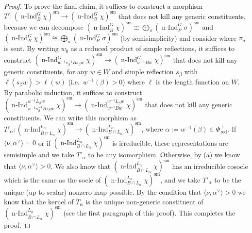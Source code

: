\documentclass[a4paper]{amsart}
\numberwithin{equation}{section}
\theoremstyle{remark}
\theoremstyle{definition}
\DeclareMathOperator{\nInd}{n-Ind}
\newcommand{\sm}{\mathrm{sm}}
\newcommand{\red}{\mathrm{red}}
\newcommand{\ang}[1]{\langle #1\rangle}
\renewcommand{\o}[1]{\overline{#1}}
\begin{document}
\begin{proof}
  To prove the final claim, it suffices to construct a morphism $T' \colon (\nInd_{\o B}^{G} \chi)^{\sm} \to (\nInd_{B}^{G} \chi)^{\sm}$ that does not kill any generic constituents, because we can decompose $(\nInd_{\o B}^{G} \chi)^{\sm} \cong \bigoplus_\sigma (\nInd_{\o P}^{G} \sigma)^{\sm}$ and $(\nInd_{B}^{G} \chi)^{\sm} \cong \bigoplus_\sigma (\nInd_{P}^{G} \sigma)^{\sm}$ (by semisimplicity) and consider where $\pi_\sigma$ is sent.
  By writing $w_0$ as a reduced product of simple reflections, it suffices to construct $(\nInd_{w^{-1} s_\beta^{-1} B s_\beta w}^{G} \chi)^{\sm} \to (\nInd_{w^{-1} B w}^{G} \chi)^{\sm}$ that does not kill any generic constituents, for any $w \in W$ and simple reflection $s_\beta$ with $\ell(s_\beta w) > \ell(w)$ (i.e.\ $w^{-1}(\beta) > 0$) where $\ell$ is the length function on $W$.
  By parabolic induction, it suffices to construct $(\nInd_{w^{-1} s_\beta^{-1} B s_\beta w}^{w^{-1} L_\beta w} \chi)^{\sm} \to (\nInd_{w^{-1} B w}^{w^{-1} L_\beta w} \chi)^{\sm}$ that does not kill any generic constituents.
  We can write this morphism as $T'_\alpha \colon (\nInd_{\o B \cap L_\alpha}^{L_\alpha} \chi)^{\sm} \to (\nInd_{B \cap L_\alpha}^{L_\alpha} \chi)^{\sm}$, where $\alpha := w^{-1}(\beta) \in \Phi^+_{\red}$.
  If $\ang{\nu,\alpha^\vee} = 0$ or if $(\nInd_{B \cap L_\alpha}^{L_\alpha} \chi)^{\sm}$ is irreducible, these representations are semisimple and we take $T'_\alpha$ to be any isomorphism.
  Otherwise, by (a) we know that $\ang{\nu,\alpha^\vee} > 0$.
  We also know that $(\nInd_{\o B \cap L_\alpha}^{L_\alpha} \chi)^{\sm}$ has an irreducible cosocle which is the same as the socle of $(\nInd_{B \cap L_\alpha}^{L_\alpha} \chi)^{\sm}$, and we take $T'_\alpha$ to be the unique (up to scalar) nonzero map possible.
  By the condition that $\ang{\nu,\alpha^\vee} > 0$ we know that the kernel of $T_\alpha$ is the unique non-generic constituent of $(\nInd_{\o B \cap L_\alpha}^{L_\alpha} \chi)^{\sm}$ (see the first paragraph of this proof).
  This completes the proof.
\end{proof}
\end{document}
